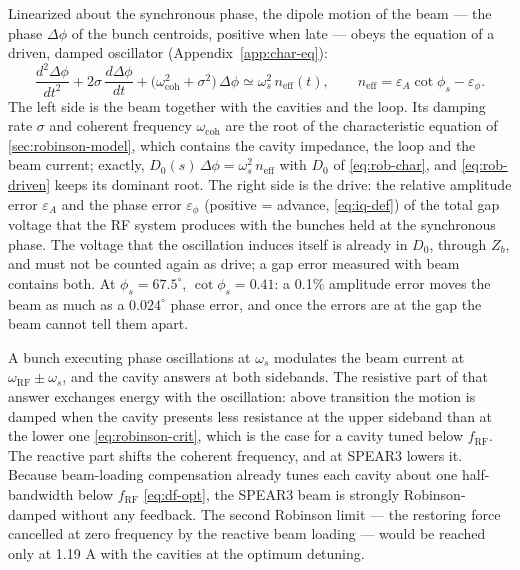 Linearized about the synchronous phase, the dipole motion of the beam --- the phase \(\Delta\phi\) of the bunch centroids, positive when late --- obeys the equation of a driven, damped oscillator (Appendix~\ref{app:char-eq}):
\begin{equation}\label{eq:rob-driven}
\frac{d^2\Delta\phi}{dt^2} + 2\sigma\,\frac{d\Delta\phi}{dt} + \bigl(\omega_\text{coh}^2 + \sigma^2\bigr)\,\Delta\phi \simeq \omega_s^2\,n_\text{eff}(t),
\qquad
n_\text{eff} = \varepsilon_A\cot\phi_s - \varepsilon_\phi .
\end{equation}
The left side is the beam together with the cavities and the loop. Its damping rate \(\sigma\) and coherent frequency \(\omega_\text{coh}\) are the root of the characteristic equation of \cref{sec:robinson-model}, which contains the cavity impedance, the loop and the beam current; exactly, \(D_0(s)\,\Delta\phi = \omega_s^2\,n_\text{eff}\) with \(D_0\) of \cref{eq:rob-char}, and \cref{eq:rob-driven} keeps its dominant root. The right side is the drive: the relative amplitude error \(\varepsilon_A\) and the phase error \(\varepsilon_\phi\) (positive = advance, \cref{eq:iq-def}) of the total gap voltage that the RF system produces with the bunches held at the synchronous phase. The voltage that the oscillation induces itself is already in \(D_0\), through \(Z_b\), and must not be counted again as drive; a gap error measured with beam contains both. At \(\phi_s = 67.5^\circ\), \(\cot\phi_s = 0.41\): a 0.1\% amplitude error moves the beam as much as a \(0.024^\circ\) phase error, and once the errors are at the gap the beam cannot tell them apart.

A bunch executing phase oscillations at \(\omega_s\) modulates the beam current at \(\omega_\text{RF} \pm \omega_s\), and the cavity answers at both sidebands. The resistive part of that answer exchanges energy with the oscillation: above transition the motion is damped when the cavity presents less resistance at the upper sideband than at the lower one \eqref{eq:robinson-crit}, which is the case for a cavity tuned below \(f_\text{RF}\). The reactive part shifts the coherent frequency, and at SPEAR3 lowers it. Because beam-loading compensation already tunes each cavity about one half-bandwidth below \(f_\text{RF}\) \eqref{eq:df-opt}, the SPEAR3 beam is strongly Robinson-damped without any feedback. The second Robinson limit --- the restoring force cancelled at zero frequency by the reactive beam loading --- would be reached only at 1.19 A with the cavities at the optimum detuning.

